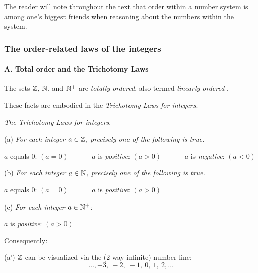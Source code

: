 The reader will note throughout the text that order within a number
system is among one's biggest friends when reasoning about the numbers
within the system.  

\subsubsection{The order-related laws of the integers}
\label{sec:order-laws}

\paragraph{\small\sf A. Total order and the Trichotomy Laws}

The sets $\mathbb{Z}$, $\mathbb{N}$, and $\mathbb{N}^+$ are {\em totally ordered},
also termed {\em linearly ordered}
.

\smallskip

These facts are embodied in the {\em Trichotomy Laws for integers}.

\medskip

{\it The Trichotomy Laws for integers}.

\smallskip

(a)
%
{\it For each integer $a \in \mathbb{Z}$, precisely one of the following is true.}

\hspace*{.2in} $a$ equals $0$: $(a=0)$ \ \ \ \ \ \
 $a$ is {\em positive}: $(a>0)$ \ \ \ \ \ \
 $a$ is {\em negative}: $(a<0)$

\smallskip

(b)
%
{\it For each integer $a \in \mathbb{N}$, precisely one of the following is true.}

\hspace*{.2in} $a$ equals $0$: $(a=0)$ \ \ \ \ \ \
 $a$ is {\em positive}: $(a>0)$

\smallskip

(c)
%
{\it For each integer $a \in \mathbb{N}^+$:}

\hspace*{.2in} $a$ is {\em positive}: $(a>0)$

\bigskip

Consequently:

\smallskip

(a')
$\mathbb{Z}$ can be visualized via the ($2$-way infinite) number line:
\[ \ldots, -3, \  -2, \ -1, \ 0, \ 1,\  2, \ldots \]

